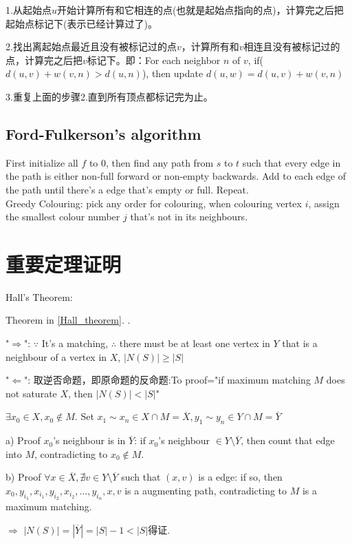 \documentclass[12pt,a4paper]{ctexrep}
\begin{document}
1.从起始点$u$开始计算所有和它相连的点(也就是起始点指向的点)，计算完之后把起始点标记下(表示已经计算过了)。

2.找出离起始点最近且没有被标记过的点$v$，计算所有和$v$相连且没有被标记过的点，计算完之后把$v$标记下。即：For each neighbor $n$ of $v$, if($d(u,v)+w(v,n)>d(u,n)$), then update $d(u,w)=d(u,v)+w(v,n)$

3.重复上面的步骤2.直到所有顶点都标记完为止。

\subsection{Ford-Fulkerson's algorithm}
First initialize all $f$ to 0, then find any path from $s$ to $t$ such that every edge in the path is either non-full forward or non-empty backwards. Add to each edge of the path until there's a edge that's empty or full. Repeat.\\

\noindent Greedy Colouring: pick any order for colouring, when colouring vertex $i$, assign the smallest colour number $j$ that's not in its neighbours.
\section{重要定理证明}
\noindent Hall's Theorem:

Theorem in \hyperlink{Hall_theorem}{\ref{Hall_theorem}}. \label{Hall_proof}\hypertarget{Hall_proof}{}.

"$\Rightarrow$": $\because$ It's a matching, $\therefore$ there must be at least one vertex in $Y$ that is a neighbour of a vertex in $X$, $|N(S)|\geq |S|$

"$\Leftarrow$": 取逆否命题，即原命题的反命题:To proof="if maximum matching $M$ does not saturate $X$, then $|N(S)|<|S|$"

$\exists x_{0}\in X, x_{0}\notin M.$ Set $x_{1} \sim x_{n} \in X\cap M = \overline{X}, y_{1} \sim y_{n} \in Y\cap M = \overline{Y}$

a) Proof $x_{0}$'s neighbour is in $\overline{Y}$: if $x_{0}$'s neighbour $\in Y\setminus\overline{Y}$, then count that edge into $M$, contradicting to $x_{0} \notin M$.

b) Proof $\forall x \in \overline{X}, \nexists v\in Y\setminus\overline{Y}$ such that $(x,v)$ is a edge: if so, then $x_{0}, y_{i_{1}}, x_{i_{1}}, y_{i_{2}}, x_{i_{2}}, \dots, y_{i_{n}}, x, v$ is a augmenting path, contradicting to $M$ is a maximum matching.

$\Rightarrow$ $|N(S)| = |\overline{Y}| = |S|-1 < |S|$得证.
\end{document}
